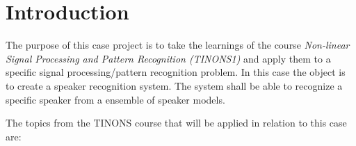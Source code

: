 \section*{Introduction}
The purpose of this case project is to take the learnings of the course \emph{Non-linear Signal Processing and Pattern Recognition (TINONS1)} and apply them to a specific signal processing/pattern recognition problem.
In this case the object is to create a speaker recognition system.
The system shall be able to recognize a specific speaker from a ensemble of speaker models.

The topics from the TINONS course that will be applied in relation to this case are:
